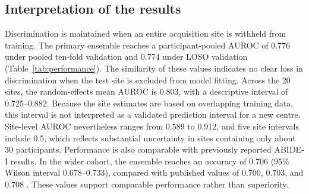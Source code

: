 \subsection{Interpretation of the results}
\label{subsec:discussion-results}

Discrimination is maintained when an entire acquisition site is withheld from training. The primary ensemble reaches a participant-pooled AUROC of 0.776 under pooled ten-fold validation and 0.774 under LOSO validation (Table~\ref{tab:performance}). The similarity of these values indicates no clear loss in discrimination when the test site is excluded from model fitting. Across the 20 sites, the random-effects mean AUROC is 0.803, with a descriptive interval of 0.725--0.882. Because the site estimates are based on overlapping training data, this interval is not interpreted as a validated prediction interval for a new centre. Site-level AUROC nevertheless ranges from 0.589 to 0.912, and five site intervals include 0.5, which reflects substantial uncertainty in sites containing only about 30 participants. Performance is also comparable with previously reported ABIDE-I results. In the wider cohort, the ensemble reaches an accuracy of 0.706 (95\% Wilson interval 0.678--0.733), compared with published values of 0.700, 0.703, and 0.708 \citep{Heinsfeldetal2018,Eslamietal2019,AlmuqhimSaeed2021}. These values support comparable performance rather than superiority. 

